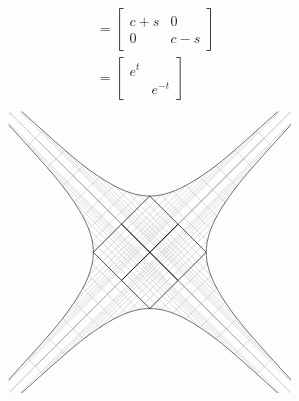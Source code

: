 \documentclass{scrartcl}
\begin{document}
\begin{multicols*}{2}
\begin{align*}
{          } \\
    &=
      \begin{bmatrix}
        c+s & 0 \\
        0 & c-s
      \end{bmatrix} \\
    &=
      \begin{bmatrix}
        e^t \\ & e^{-t}
      \end{bmatrix}
  \end{align*}
  \[
    \begin{tikzpicture}[rotate=45]
      \def\L{5}
      \clip (-\L,0)   -- (0,\L) -- (\L,0) -- (0,-\L) --cycle;
      \foreach \t in {0,0.2,...,1.6}
      \draw[lightgray]
      (0,0) rectangle ({exp \t},{exp -\t})
      (0,0) rectangle ({exp -\t},{exp \t})
      (0,0) rectangle ({exp \t},{-exp -\t})
      (0,0) rectangle ({exp -\t},{-exp \t})
      (0,0) rectangle ({-exp \t},{exp -\t})
      (0,0) rectangle ({-exp -\t},{exp \t})
      (0,0) rectangle ({-exp \t},{-exp -\t})
      (0,0) rectangle ({-exp -\t},{-exp \t})
      ;
      \draw[samples=5, domain=-2:2,smooth, variable=\t]
      plot ({exp \t}, {exp -\t})
      plot ({exp \t}, {-exp -\t})
      plot ({-exp \t}, {exp -\t})
      plot ({-exp \t}, {-exp -\t})
      ;
      \draw
      (0,0) rectangle (1,1)
      (0,0) rectangle (1,-1)
      (0,0) rectangle (-1,1)
      (0,0) rectangle (-1,-1) ;
    \end{tikzpicture}
  \]
\end{multicols*}
\end{document}
